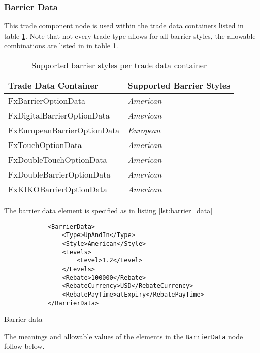 \subsubsection{Barrier Data}
\label{ss:barrier_data} 

This trade component node is used within the trade data containers listed in table \ref{tab:barrierstyles}. Note that not
every trade type allows for all barrier styles, the allowable combinations are listed in in table \ref{tab:barrierstyles}.

\begin{table}
  \centering
  \begin{tabular}{l | l}
    Trade Data Container & Supported Barrier Styles \\ \hline
    FxBarrierOptionData & \emph{American} \\
    FxDigitalBarrierOptionData & \emph{American} \\
    FxEuropeanBarrierOptionData & \emph{European} \\
    FxTouchOptionData & \emph{American} \\
    FxDoubleTouchOptionData & \emph{American} \\
    FxDoubleBarrierOptionData & \emph{American} \\
    FxKIKOBarrierOptionData & \emph{American}
\end{tabular}
  \caption{Supported barrier styles per trade data container}
  \label{tab:barrierstyles}
\end{table}

The barrier data element is specified as in listing \ref{lst:barrier_data}

\begin{listing}[H]
\begin{verbatim}
            <BarrierData>
                <Type>UpAndIn</Type>
                <Style>American</Style>
                <Levels>
                    <Level>1.2</Level>
                </Levels>
                <Rebate>100000</Rebate>
                <RebateCurrency>USD</RebateCurrency>
                <RebatePayTime>atExpiry</RebatePayTime>
            </BarrierData>
\end{verbatim}
\caption{Barrier data}
\label{lst:barrier_data}
\end{listing}

The meanings and allowable values of the elements in the \lstinline!BarrierData! node follow below.

